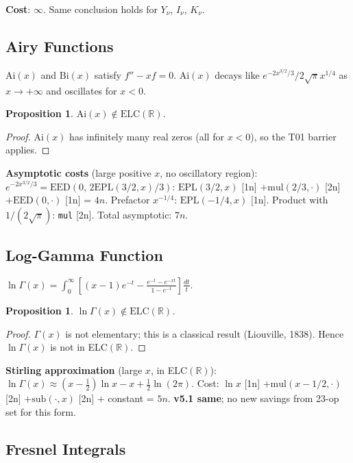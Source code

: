 \documentclass[11pt]{article}
\newtheorem{proposition}[theorem]{Proposition}
\begin{document}
\textbf{Cost}: $\infty$. Same conclusion holds for $Y_\nu$, $I_\nu$, $K_\nu$.

\subsection{Airy Functions}

$\mathrm{Ai}(x)$ and $\mathrm{Bi}(x)$ satisfy $f''-xf=0$.
$\mathrm{Ai}(x)$ decays like $e^{-2x^{3/2}/3}/2\sqrt\pi x^{1/4}$ as $x\to+\infty$
and oscillates for $x<0$.

\begin{proposition}
$\mathrm{Ai}(x)\notin\mathrm{ELC}(\mathbb{R})$.
\end{proposition}

\begin{proof}
$\mathrm{Ai}(x)$ has infinitely many real zeros (all for $x<0$), so the T01 barrier applies.
\end{proof}

\textbf{Asymptotic costs} (large positive $x$, no oscillatory region):
$e^{-2x^{3/2}/3}=\mathrm{EED}(0,\,2\mathrm{EPL}(3/2,x)/3)$:
$\mathrm{EPL}(3/2,x)$ [1n] $+ \mathrm{mul}(2/3,\cdot)$ [2n] $+ \mathrm{EED}(0,\cdot)$ [1n] = $4n$.
Prefactor $x^{-1/4}$: $\mathrm{EPL}(-1/4,x)$ [1n].
Product with $1/(2\sqrt\pi)$: \texttt{mul} [2n]. Total asymptotic: $7n$.

\subsection{Log-Gamma Function}

$\ln\Gamma(x) = \int_0^\infty\left[(x-1)e^{-t} - \frac{e^{-t}-e^{-xt}}{1-e^{-t}}\right]\frac{dt}{t}$.

\begin{proposition}
$\ln\Gamma(x)\notin\mathrm{ELC}(\mathbb{R})$.
\end{proposition}

\begin{proof}
$\Gamma(x)$ is not elementary; this is a classical result (Liouville, 1838).
Hence $\ln\Gamma(x)$ is not in ELC$(\mathbb{R})$.
\end{proof}

\textbf{Stirling approximation} (large $x$, in ELC$(\mathbb{R})$):
$\ln\Gamma(x)\approx(x-\tfrac12)\ln x - x + \tfrac12\ln(2\pi)$.
Cost: $\ln x$ [1n] $+ \mathrm{mul}(x-1/2, \cdot)$ [2n] $+ \mathrm{sub}(\cdot,x)$ [2n] $+$ constant = $5n$.
\textbf{v5.1 same}; no new savings from 23-op set for this form.

\subsection{Fresnel Integrals}
\end{document}
